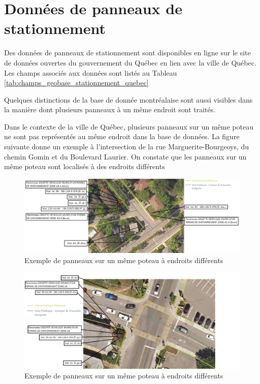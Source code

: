\FloatBarrier
\section{Données de panneaux de stationnement}
Des données de panneaux de stationnement sont disponibles en ligne sur le site de données ouvertes du gouvernement du Québec en lien avec la ville de Québec. Les champs associés aux données sont listés au Tableau \ref{tab:champs_geobase_stationnement_quebec}



Quelques distinctions de la base de donnée montréalaise sont aussi visibles dans la manière dont plusieurs panneaux à un même endroit sont traités. 

Dans le contexte de la ville de Québec, plusieurs panneaux sur un même poteau ne sont pas représentés au même endroit dans la base de données. La figure suivante donne un exemple à l'intersection de la rue Marguerite-Bourgeoys, du chemin Gomin et du Boulevard Laurier. On constate que les panneaux sur un même poteau sont localisés à des endroits différents

\begin{figure}[ht]
    \centering
    \includegraphics[width=1.0\textwidth]{images/enjeux_BD_panneaux_stationnement_Laurier.png}
    \caption{Exemple de panneaux sur un même poteau à endroits différents}
    \label{fig:enjeux_panneaux_Laurier}
  \end{figure}
  \begin{figure}[ht]
    \centering
    \includegraphics[width=1.0\textwidth]{images/enjeux_BD_panneaux_stationnement_Desroches.png}
    \caption{Exemple de panneaux sur un même poteau à endroits différents}
    \label{fig:enjeux_panneaux_Desroches}
  \end{figure}

  \FloatBarrier